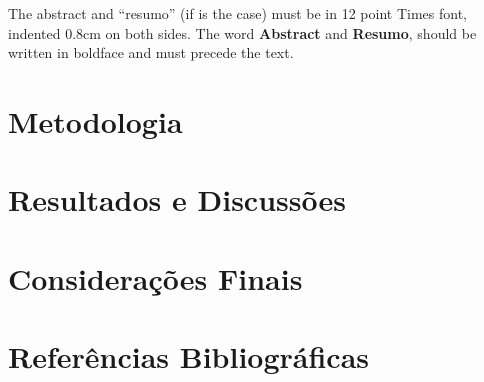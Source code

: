 \documentclass[12pt]{article}
\begin{document}
The abstract and ``resumo'' (if is the case) must be in 12 point Times font,
indented 0.8cm on both sides. The word \textbf{Abstract} and \textbf{Resumo},
should be written in boldface and must precede the text.

\section{Metodologia}
\label{sec:metodologia}

\section{Resultados e Discussões}
\label{sec:resultados}

\section{Considerações Finais}
\label{sec:finais}







\section{Referências Bibliográficas}



\end{document}
